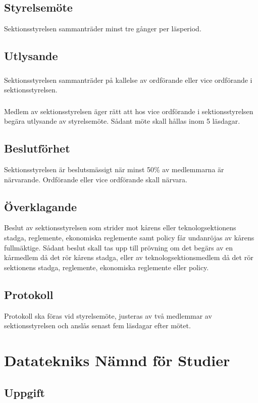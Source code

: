 \documentclass[a4paper]{dtek}
\begin{document}
\subsection{Styrelsemöte}
Sektionsstyrelsen sammanträder minst tre gånger per läsperiod.
\subsection{Utlysande}
\subsubsection{}
Sektionsstyrelsen sammanträder på kallelse av ordförande eller vice ordförande i sektionsstyrelsen.
\subsubsection{}
Medlem av sektionsstyrelsen äger rätt att hos vice ordförande i sektionsstyrelsen begära utlysande av styrelsemöte. Sådant möte skall hållas inom 5 läsdagar.
\subsection{Beslutförhet}
Sektionsstyrelsen är beslutsmässigt när minst 50\% av medlemmarna är närvarande. Ordförande eller vice ordförande skall närvara.
\subsection{Överklagande}
Beslut av sektionsstyrelsen som strider mot kårens eller teknologsektionens stadga, reglemente, ekonomiska reglemente samt policy får undanröjas av kårens fullmäktige. Sådant beslut skall tas upp till prövning om det begärs av en kårmedlem då det rör kårens stadga, eller av teknologsektionsmedlem då det rör sektionens stadga, reglemente, ekonomiska reglemente eller policy.
\subsection{Protokoll}
Protokoll ska föras vid styrelsemöte, justeras av två medlemmar av
sektionsstyrelsen och anslås senast fem läsdagar efter mötet.
\newpage

\section{Datatekniks Nämnd för Studier}
\subsection{Uppgift}
\end{document}
